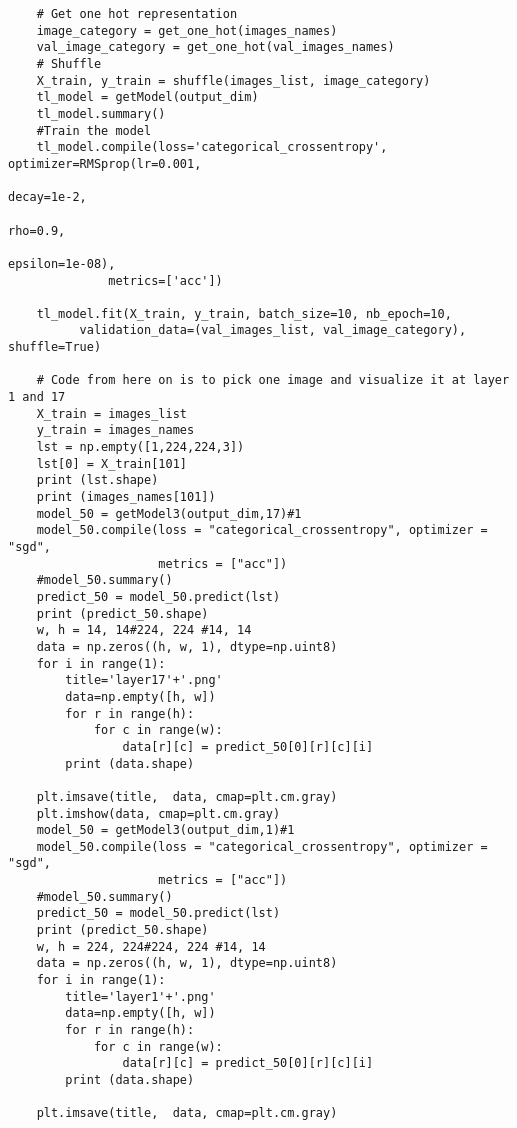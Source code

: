 \documentclass{article}
\begin{document}
\begin{lstlisting}
    # Get one hot representation
    image_category = get_one_hot(images_names)
    val_image_category = get_one_hot(val_images_names)
    # Shuffle
    X_train, y_train = shuffle(images_list, image_category)
    tl_model = getModel(output_dim) 
    tl_model.summary()
    #Train the model
    tl_model.compile(loss='categorical_crossentropy', optimizer=RMSprop(lr=0.001,
                                                                    decay=1e-2,
                                                                    rho=0.9,
                                                                    epsilon=1e-08), 
              metrics=['acc'])
    
    tl_model.fit(X_train, y_train, batch_size=10, nb_epoch=10, 
          validation_data=(val_images_list, val_image_category), shuffle=True)

    # Code from here on is to pick one image and visualize it at layer 1 and 17
    X_train = images_list
    y_train = images_names
    lst = np.empty([1,224,224,3])
    lst[0] = X_train[101]
    print (lst.shape)
    print (images_names[101])
    model_50 = getModel3(output_dim,17)#1
    model_50.compile(loss = "categorical_crossentropy", optimizer = "sgd", 
                     metrics = ["acc"])
    #model_50.summary()
    predict_50 = model_50.predict(lst)
    print (predict_50.shape)
    w, h = 14, 14#224, 224 #14, 14
    data = np.zeros((h, w, 1), dtype=np.uint8)
    for i in range(1):
        title='layer17'+'.png'
        data=np.empty([h, w])
        for r in range(h):
            for c in range(w):
                data[r][c] = predict_50[0][r][c][i]
        print (data.shape)

    plt.imsave(title,  data, cmap=plt.cm.gray)
    plt.imshow(data, cmap=plt.cm.gray)
    model_50 = getModel3(output_dim,1)#1
    model_50.compile(loss = "categorical_crossentropy", optimizer = "sgd", 
                     metrics = ["acc"])
    #model_50.summary()
    predict_50 = model_50.predict(lst)
    print (predict_50.shape)
    w, h = 224, 224#224, 224 #14, 14
    data = np.zeros((h, w, 1), dtype=np.uint8)
    for i in range(1):
        title='layer1'+'.png'
        data=np.empty([h, w])
        for r in range(h):
            for c in range(w):
                data[r][c] = predict_50[0][r][c][i]
        print (data.shape)

    plt.imsave(title,  data, cmap=plt.cm.gray)
    
\end{lstlisting}
\end{document}
